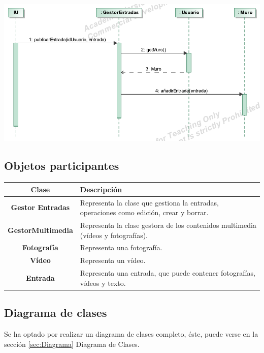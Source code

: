 \documentclass[12pt, a4paper, titlepage]{article}
\begin{document}
\begin{center}
	\includegraphics{Imagenes/OperacionPublicarEntrada.pdf}
\end{center}
\subsection{Objetos participantes}

\begin{center}

\begin{tabular}{|c|p{12cm}|}
	\hline
	\textbf{Clase} & \textbf{Descripción}\\ \hline
	\textbf{Gestor Entradas} & Representa la clase que gestiona la entradas, operaciones como edición, crear y borrar.\\ \hline
	\textbf{GestorMultimedia} & Representa la clase gestora de los contenidos multimedia (vídeos y fotografías). \\ \hline
	\textbf{Fotografía} & Representa una fotografía.\\ \hline
	\textbf{Vídeo} & Representa un vídeo. \\ \hline
	\textbf{Entrada} & Representa una entrada, que puede contener fotografías, vídeos y texto.\\ \hline
\end{tabular}

\end{center}

\subsection{Diagrama de clases}
Se ha optado por realizar un diagrama de clases completo, éste, puede verse en la sección \ref{sec:Diagrama} Diagrama de Clases.
\end{document}
